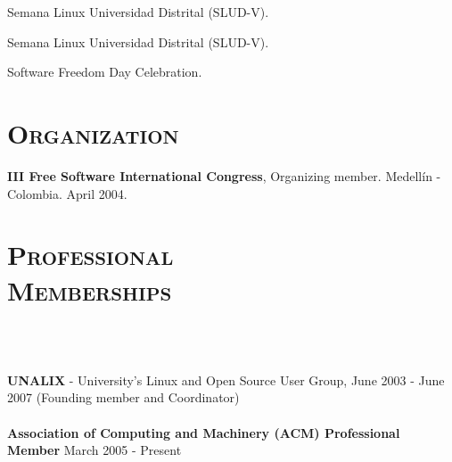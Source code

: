 \begin{resume}
\begin{formatb}
  \\
  \\
   \body
\end{formatb}

\begin{position}
Semana Linux Universidad Distrital (SLUD-V).
\end{position}

\begin{position}
Semana Linux Universidad Distrital (SLUD-V).
\end{position}

\begin{position}
Software Freedom Day Celebration.
\end{position}
\newline     
\newline     
\newline     
\newline     


\section{\textsc{Organization}}
\employer{\textbf{}}
\dates{}
\textbf{III Free Software International Congress}, Organizing member. Medell\'{i}n - Colombia. April 2004.

\section{\textsc{Professional\\ Memberships}}

\begin{formatb}
  \\
  \body\\
\end{formatb}
\employer{}
   {\textbf{UNALIX} - University's Linux and Open Source User Group,
     June 2003 - June 2007 (Founding member and Coordinator)\\ \\
    \textbf{Association of Computing and Machinery (ACM) Professional 
      Member} March 2005 - Present 
 

}
\end{resume}
